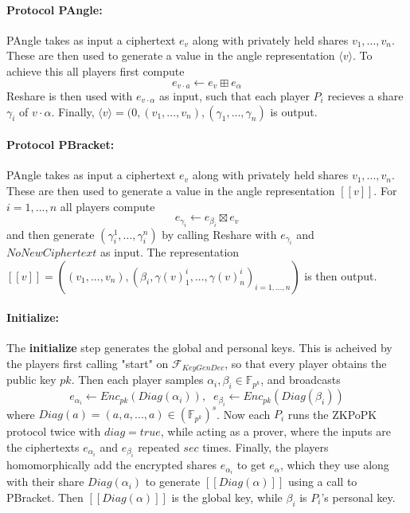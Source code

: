 \documentclass[../main.tex]{subfiles}
\begin{document}
\paragraph{Protocol PAngle:}
PAngle takes as input a ciphertext $e_v$ along with privately held shares $v_1, ..., v_n$. These are then used to generate a value in the angle representation $\langle v \rangle$.
To achieve this all players first compute $$e_{v \cdot a} \leftarrow e_v \boxplus e_\alpha$$
Reshare is then used with $e_{v \cdot \alpha}$ as input, such that each player $P_i$ recieves a share $\gamma_i$ of $v \cdot \alpha$. Finally, $\langle v \rangle = (0, (v_1, ..., v_n), (\gamma_1, ..., \gamma_n)$ is output.

\paragraph{Protocol PBracket:}
PAngle takes as input a ciphertext $e_v$ along with privately held shares $v_1, ..., v_n$. These are then used to generate a value in the angle representation $[\![ v ]\!]$.
For $i = 1, ..., n$ all players compute $$e_{\gamma_i} \leftarrow e_{\beta_i} \boxtimes e_v$$ and then generate $(\gamma^1_i, ..., \gamma^n_i)$ by calling Reshare with $e_{\gamma_i}$ and $NoNewCiphertext$ as input.
The representation $[\![ v ]\!] = ((v_1, ..., v_n), (\beta_i, \gamma(v)^i_1, ..., \gamma(v)^i_n)_{i = 1, ..., n})$ is then output.

\paragraph{Initialize:}
The \textbf{initialize} step generates the global and personal keys. This is acheived by the players first calling "start" on $\mathcal{F}_{KeyGenDec}$, so that every player obtains the public key $pk$.
Then each player samples $\alpha_i, \beta_i \in \mathbb{F}_{p^k}$, and broadcasts $$e_{\alpha_i} \leftarrow Enc_{pk}(Diag(\alpha_i)), \;\; e_{\beta_i} \leftarrow Enc_{pk}(Diag(\beta_i))$$ where $Diag(a) = (a, a, ..., a) \in (\mathbb{F}_{p^k})^s$. Now each $P_i$ runs the ZKPoPK protocol twice with $diag = true$, while acting as a prover, where the inputs are the ciphertexts $e_{\alpha_i}$ and $e_{\beta_i}$ repeated $sec$ times.
Finally, the players homomorphically add the encrypted shares $e_{\alpha_i}$ to get $e_\alpha$, which they use along with their share $Diag(\alpha_i)$ to generate $[\![ Diag(\alpha) ]\!]$ using a call to PBracket. Then $[\![ Diag(\alpha) ]\!]$ is the global key, while $\beta_i$ is $P_i$'s personal key.
\end{document}
